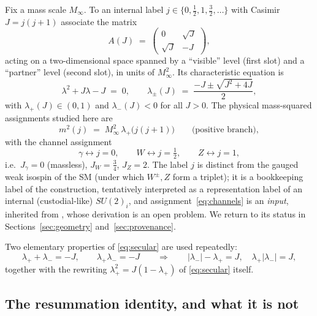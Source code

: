 \documentclass[11pt,a4paper]{article}
\theoremstyle{definition}
\newcommand{\Minf}{M_\infty}
\begin{document}
Fix a mass scale $\Minf$. To an internal label
$j\in\{0,\tfrac12,1,\tfrac32,\dots\}$ with Casimir $J=j(j+1)$ associate the
matrix
\begin{equation}
A(J)\;=\;\begin{pmatrix} 0 & \sqrt{J}\\[2pt] \sqrt{J} & -J\end{pmatrix},
\label{eq:kernel}
\end{equation}
acting on a two-dimensional space spanned by a ``visible'' level (first
slot) and a ``partner'' level (second slot), in units of $\Minf^2$. Its
characteristic equation is
\begin{equation}
\lambda^2 + J\lambda - J \;=\; 0,
\qquad
\lambda_\pm(J)\;=\;\frac{-J\pm\sqrt{J^2+4J}}{2},
\label{eq:secular}
\end{equation}
with $\lambda_+(J)\in(0,1)$ and $\lambda_-(J)<0$ for all $J>0$. The
physical mass-squared assignments studied here are
\begin{equation}
m^2(j) \;=\; \Minf^2\,\lambda_+\!\bigl(j(j+1)\bigr)
\qquad\text{(positive branch)},
\label{eq:masses}
\end{equation}
with the channel assignment
\begin{equation}
\gamma \leftrightarrow j=0,\qquad
W \leftrightarrow j=\tfrac12,\qquad
Z \leftrightarrow j=1,
\label{eq:channels}
\end{equation}
i.e.\ $J_\gamma=0$ (massless), $J_W=\tfrac34$, $J_Z=2$. The label $j$ is
distinct from the gauged weak isospin of the SM (under which $W^\pm,Z$ form
a triplet); it is a bookkeeping label of the construction, tentatively
interpreted as a representation label of an internal (custodial-like)
$SU(2)_i$, and assignment~\eqref{eq:channels} is an \emph{input}, inherited
from \cite{rivero2006}, whose derivation is an open problem. We return to
its status in Sections~\ref{sec:geometry} and~\ref{sec:provenance}.

Two elementary properties of \eqref{eq:secular} are used repeatedly:
\begin{equation}
\lambda_+ + \lambda_- = -J, \qquad \lambda_+\lambda_- = -J
\qquad\Longrightarrow\qquad
|\lambda_-| - \lambda_+ = J,\quad \lambda_+|\lambda_-| = J,
\label{eq:vieta}
\end{equation}
together with the rewriting $\lambda_+^2=J(1-\lambda_+)$ of
\eqref{eq:secular} itself.

\subsection{The resummation identity, and what it is not}
\end{document}
